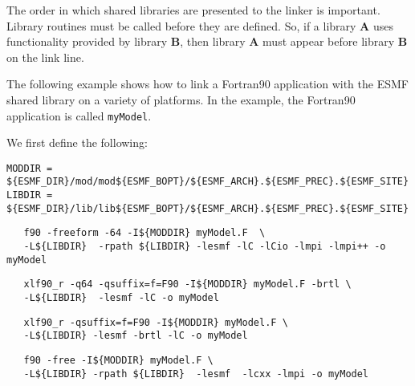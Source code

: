 The order in which shared libraries are presented to 
the linker is important. Library routines must be called before they are 
defined. So, if a library {\bf A} uses functionality provided by library 
{\bf B}, then library {\bf A} must appear before library {\bf B} on the link line. 

The following example shows how to link a Fortran90 
application with the ESMF shared library on a variety of platforms.  
In the example, the Fortran90 application is called {\tt myModel}.

\noindent We first define the following:

\begin{verbatim}
MODDIR = ${ESMF_DIR}/mod/mod${ESMF_BOPT}/${ESMF_ARCH}.${ESMF_PREC}.${ESMF_SITE}
LIBDIR = ${ESMF_DIR}/lib/lib${ESMF_BOPT}/${ESMF_ARCH}.${ESMF_PREC}.${ESMF_SITE}
\end{verbatim}


\begin{verbatim}
   f90 -freeform -64 -I${MODDIR} myModel.F  \
   -L${LIBDIR}  -rpath ${LIBDIR} -lesmf -lC -lCio -lmpi -lmpi++ -o myModel  
\end{verbatim}


\begin{verbatim}
   xlf90_r -q64 -qsuffix=f=F90 -I${MODDIR} myModel.F -brtl \
   -L${LIBDIR}  -lesmf -lC -o myModel
\end{verbatim}


\begin{verbatim}
   xlf90_r -qsuffix=f=F90 -I${MODDIR} myModel.F \
   -L${LIBDIR} -lesmf -brtl -lC -o myModel
\end{verbatim}


\begin{verbatim}
   f90 -free -I${MODDIR} myModel.F \
   -L${LIBDIR} -rpath ${LIBDIR}  -lesmf  -lcxx -lmpi -o myModel
\end{verbatim}








